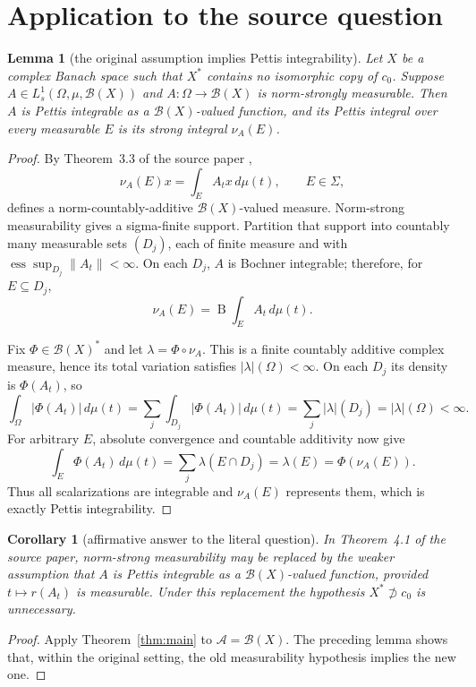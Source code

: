 \documentclass[11pt]{article}
\newtheorem{corollary}[theorem]{Corollary}
\newtheorem{lemma}[theorem]{Lemma}
\theoremstyle{remark}
\newcommand{\B}{\mathcal B}
\newcommand{\A}{\mathcal A}
\newcommand{\dd}{\,d\mu}
\newcommand{\ess}{\operatorname{ess}}
\begin{document}
\section{Application to the source question}

\begin{lemma}[the original assumption implies Pettis integrability]
Let $X$ be a complex Banach space such that $X^*$ contains no isomorphic copy
of $c_0$.  Suppose $A\in L_s^1(\Omega,\mu,\B(X))$ and
$A:\Omega\to\B(X)$ is norm-strongly measurable.  Then $A$ is Pettis
integrable as a $\B(X)$-valued function, and its Pettis integral over every
measurable $E$ is its strong integral $\nu_A(E)$.
\end{lemma}

\begin{proof}
By Theorem~3.3 of the source paper \cite{source},
\[
 \nu_A(E)x=\int_E A_tx\dd(t),\qquad E\in\Sigma,
\]
defines a norm-countably-additive $\B(X)$-valued measure.  Norm-strong
measurability gives a sigma-finite support.  Partition that support into
countably many measurable sets $(D_j)$, each of finite measure and with
$\ess\sup_{D_j}\|A_t\|<\infty$.  On each $D_j$, $A$ is Bochner integrable;
therefore, for $E\subseteq D_j$,
\[
 \nu_A(E)=\mathop{\mathrm{B}}\!\int_E A_t\dd(t).
\]

Fix $\Phi\in\B(X)^*$ and let $\lambda=\Phi\circ\nu_A$.  This is a finite
countably additive complex measure, hence its total variation satisfies
$|\lambda|(\Omega)<\infty$.  On each $D_j$ its density is $\Phi(A_t)$, so
\[
 \int_\Omega |\Phi(A_t)|\dd(t)
 =\sum_j\int_{D_j}|\Phi(A_t)|\dd(t)
 =\sum_j|\lambda|(D_j)=|\lambda|(\Omega)<\infty.
\]
For arbitrary $E$, absolute convergence and countable additivity now give
\[
 \int_E\Phi(A_t)\dd(t)
 =\sum_j\lambda(E\cap D_j)=\lambda(E)=\Phi(\nu_A(E)).
\]
Thus all scalarizations are integrable and $\nu_A(E)$ represents them, which
is exactly Pettis integrability.
\end{proof}

\begin{corollary}[affirmative answer to the literal question]\label{cor:source}
In Theorem~4.1 of the source paper, norm-strong measurability may be replaced
by the weaker assumption that $A$ is Pettis integrable as a $\B(X)$-valued
function, provided $t\mapsto r(A_t)$ is measurable.  Under this replacement
the hypothesis $X^*\not\supset c_0$ is unnecessary.
\end{corollary}

\begin{proof}
Apply Theorem~\ref{thm:main} to $\A=\B(X)$.  The preceding lemma shows that,
within the original setting, the old measurability hypothesis implies the new
one.
\end{proof}
\end{document}
